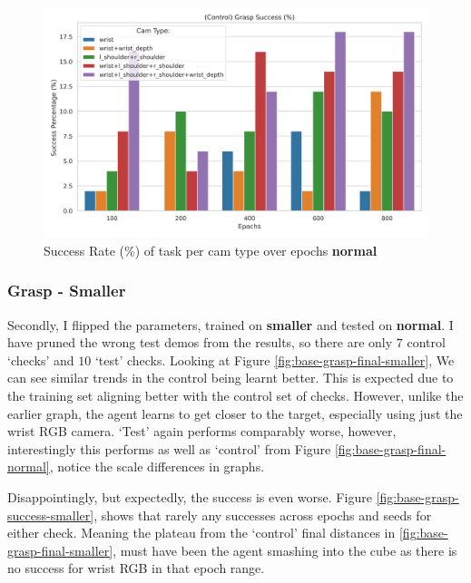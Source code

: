 \begin{figure}[H]
  \centering
  \includegraphics[scale = 0.3]{assets/evaluation/baseline/base-grasp-control-success-cams-epochs.png}
  \caption{Success Rate (\%) of task per cam type over epochs \textbf{normal}}\label{fig:base-grasp-control-success-normal}
\end{figure}

\subsubsection{Grasp - Smaller}
Secondly, I flipped the parameters, trained on \textbf{smaller} and tested on \textbf{normal}. I have pruned the wrong test demos from the results, so there are only $7$ control `checks' and $10$ `test' checks. Looking at Figure \ref{fig:base-grasp-final-smaller}, We can see similar trends in the control being learnt better. This is expected due to the training set aligning better with the control set of checks. However, unlike the earlier graph, the agent learns to get closer to the target, especially using just the wrist RGB camera. `Test' again performs comparably worse, however, interestingly this performs as well as `control' from Figure \ref{fig:base-grasp-final-normal}, notice the scale differences in graphs. 

Disappointingly, but expectedly, the success is even worse. Figure \ref{fig:base-grasp-success-smaller}, shows that rarely any successes across epochs and seeds for either check. Meaning the plateau from the `control' final distances in \ref{fig:base-grasp-final-smaller}, must have been the agent smashing into the cube as there is no success for wrist RGB in that epoch range. 

